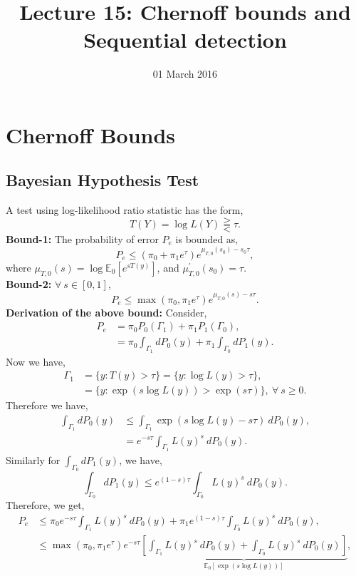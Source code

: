 \documentclass[a4paper,english,12pt]{article}
\title{Lecture 15: Chernoff bounds and Sequential detection}
\date{01 March 2016}
\begin{document}
\author{}
\maketitle
\section{Chernoff Bounds}
\subsection{Bayesian Hypothesis Test}
A test using log-likelihood ratio statistic has the form,
\begin{equation}
T(Y)=\log{L(Y)}\gtreqqless \tau.
\end{equation}
\textbf{Bound-1:}
The probability of error $P_e$ is bounded as,
\begin{equation}
P_e\leq(\pi_0+\pi_1e^\tau)e^{\mu_{T,0}(s_0)-s_0\tau},
\end{equation}
where $\mu_{T,0}(s)=\log\mathbb{E}_0[e^{sT(y)}]$, and $\mu^{'}_{T,0}(s_0)=\tau$.\\
\textbf{Bound-2:}
$\forall\ s\in[0,1]$,
\begin{equation}
P_e\leq \max(\pi_0,\pi_1e^\tau)e^{\mu_{T,0}(s)-s\tau}.
\end{equation}
\textbf{Derivation of the above bound:} Consider,
\begin{align} 
P_e &=\pi_0 P_0(\Gamma_1) + \pi_1 P_1(\Gamma_0),\nonumber\\
&=\pi_0\int_{\Gamma_1}dP_0(y) + \pi_1\int_{\Gamma_0}dP_1(y).
\end{align}
Now we have,
\begin{align} 
\Gamma_1&=\{ y:T(y)>\tau\} = \{ y:\log{L(y)}>\tau\},\nonumber\\
&= \{ y:\exp\left( s\log{L(y)}\right) > \exp( s\tau)\},\ \forall\ s\geq0.
\end{align}
Therefore we have,
\begin{align}
\int_{\Gamma_1}dP_0(y)&\leq \int_{\Gamma_1}\exp( s\log{L(y)}-s\tau)~dP_0(y),\\
&=e^{-s\tau}\int_{\Gamma_1}L(y)^s \:dP_0(y).
\end{align}
Similarly for $ \int_{\Gamma_0}dP_1(y)$, we have,
\begin{equation}
\int_{\Gamma_0}dP_1(y)\leq e^{(1-s)\tau}\int_{\Gamma_0}L(y)^s \:dP_0(y).
\end{equation}
Therefore, we get,
\begin{align}
P_e&\leq\pi_0e^{-s\tau}\int_{\Gamma_1}L(y)^s \:dP_0(y)  +\pi_1e^{(1-s)\tau}\int_{\Gamma_0}L(y)^s \:dP_0(y),\\\nonumber
&\leq \max(\pi_0,\pi_1e^\tau)e^{-s\tau}\underbrace{\left[\int_{\Gamma_1}L(y)^s \:dP_0(y)+\int_{\Gamma_0}L(y)^s \:dP_0(y)\right]}_{\mathbb{E}_0[\exp(s\log{L(y)})]},
\end{align}
\end{document}

